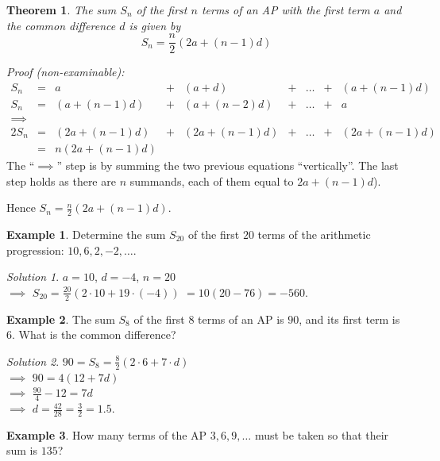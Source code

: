 \documentclass[
  12pt,
  oneside]{book}
\newtheorem{theorem}{Theorem}[chapter]
\theoremstyle{definition}
\theoremstyle{definition}
\newtheorem{example}{Example}[chapter]
\theoremstyle{definition}
\theoremstyle{definition}
\theoremstyle{remark}
\newtheorem*{solution}{Solution}
\begin{document}
\begin{theorem}
The sum \(S_n\) of the first \(n\) terms of an AP with the first term \(a\) and the common difference \(d\) is given by
\[
\boxed{S_n=\frac{n}2\left(2a+(n-1)d\right)}
\]
\end{theorem}

\emph{Proof (non-examinable):}
\[
\begin{array}{ccccccccc}
S_n &=& a & + & (a+d) & + & \dots & + & (a+(n-1)d) \\
S_n &=& (a+(n-1)d) & + & (a+(n-2)d) & + &  \dots & + & a\\
\implies \\
2S_n & = & (2a+(n-1)d) & + & (2a+(n-1)d) & + & \dots & + & (2a+(n-1)d)\\
& = & n(2a+(n-1)d)
\end{array}
\]
The ``\(\implies\)'' step is by summing the two previous equations ``vertically''. The last step holds as there are \(n\) summands, each of them equal to \(2a+(n-1)d\)).

Hence \(S_n = \frac{n}{2}(2a+(n-1)d)\).

\begin{example}
Determine the sum \(S_{20}\) of the first \(20\) terms of the arithmetic progression: \(10, 6, 2, -2, \dots\).
\end{example}

\begin{solution}
\(a=10\), \(d=-4\), \(n=20\)\\
\(\implies\) \(S_{20}=\frac{20}{2}(2\cdot 10+ 19\cdot(-4))\) \(=10(20-76)=-560\).
\end{solution}

\begin{example}
The sum \(S_8\) of the first \(8\) terms of an AP is \(90\), and its first term is \(6\). What is the common difference?
\end{example}

\begin{solution}
\(90=S_8=\frac{8}{2}(2\cdot 6 + 7\cdot d)\)\\
\(\implies\) \(90=4(12+7d)\)\\
\(\implies\) \(\frac{90}{4}-12=7d\)\\
\(\implies\) \(d=\frac{42}{28}=\frac32=1.5\).
\end{solution}

\begin{example}
How many terms of the AP \(3,6,9,\dots\) must be taken so that their sum is \(135\)?
\end{example}
\end{document}
